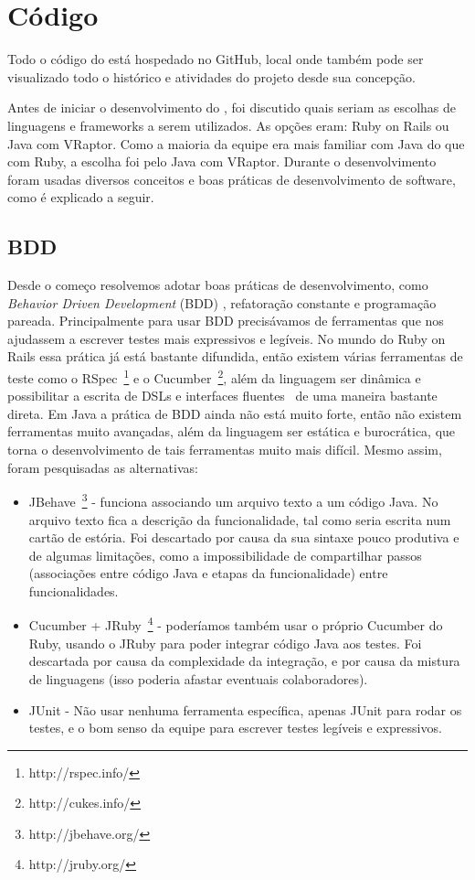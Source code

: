 \section{Código}
Todo o código do \calopsita está hospedado no GitHub, local onde também pode ser visualizado todo o histórico e atividades do projeto desde sua concepção.

Antes de iniciar o desenvolvimento do \calopsita, foi discutido quais seriam as escolhas de linguagens e frameworks a 
serem utilizados. As opções eram: Ruby on Rails ou Java com VRaptor. Como a maioria da equipe era mais familiar com Java 
do que com Ruby, a escolha foi pelo Java com VRaptor. Durante o desenvolvimento foram usadas diversos conceitos e boas
práticas de desenvolvimento de software, como é explicado a seguir.

\subsection{BDD} \label{bdd}
Desde o começo resolvemos adotar boas práticas de desenvolvimento, como {\it Behavior Driven Development} (BDD) \cite{bdd}, 
refatoração constante e programação pareada. Principalmente para usar BDD precisávamos de ferramentas que nos 
ajudassem a escrever testes mais expressivos e legíveis. No mundo do Ruby on Rails essa prática já está bastante 
difundida, então existem várias ferramentas de teste como o RSpec~\footnote{http://rspec.info/} e o
Cucumber~\footnote{http://cukes.info/}, além da linguagem ser dinâmica e possibilitar a escrita de DSLs e interfaces
fluentes~\cite{dsl} de uma maneira bastante direta. Em Java a prática de BDD ainda não está muito forte, então não existem
ferramentas muito avançadas, além da linguagem ser estática e burocrática, que torna o desenvolvimento de tais ferramentas 
muito mais difícil. Mesmo assim, foram pesquisadas as alternativas:

\begin{itemize}
	\item{JBehave~\footnote{http://jbehave.org/} - funciona associando um arquivo texto a um código Java. No arquivo texto fica 
	a descrição da funcionalidade, tal como seria escrita num cartão de estória. Foi descartado por causa da sua sintaxe 
	pouco produtiva e de algumas limitações, como a impossibilidade de compartilhar passos (associações entre código Java 
	e etapas da funcionalidade) entre funcionalidades.}
	\item{Cucumber + JRuby~\footnote{http://jruby.org/} - poderíamos também usar o próprio Cucumber do Ruby, usando o JRuby 
	para poder integrar código 
Java aos testes. Foi descartada por causa da complexidade da integração, e por causa da mistura de linguagens 
(isso poderia afastar eventuais colaboradores).}
	\item{JUnit - Não usar nenhuma ferramenta específica, apenas JUnit para rodar os testes, e o bom senso da 
equipe para escrever testes legíveis e expressivos.}
\end{itemize}

